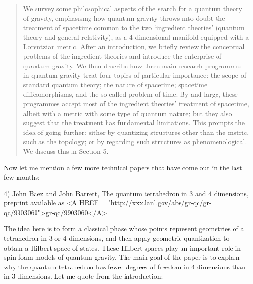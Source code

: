 \begin{quote}
We survey some philosophical aspects of the search for a quantum theory
of gravity, emphasising how quantum gravity throws into doubt the
treatment of spacetime common to the two `ingredient theories' (quantum
theory and general relativity), as a 4-dimensional manifold equipped
with a Lorentzian metric.  After an introduction, we briefly review the
conceptual problems of the ingredient theories and introduce the
enterprise of quantum gravity.  We then describe how three main research
programmes in quantum gravity treat four topics of particular
importance: the scope of standard quantum theory; the nature of
spacetime; spacetime diffeomorphisms, and the so-called problem of time.
By and large, these programmes accept most of the ingredient theories'
treatment of spacetime, albeit with a metric with some type of quantum
nature; but they also suggest that the treatment has fundamental
limitations.  This prompts the idea of going further: either by
quantizing structures other than the metric, such as the topology; or by
regarding such structures as phenomenological.  We discuss this in
Section 5.
\end{quote}

Now let me mention a few more technical papers that have come out in
the last few months:

4) John Baez and John Barrett, The quantum tetrahedron in 3
and 4 dimensions, preprint available as 
<A HREF = "http://xxx.lanl.gov/abs/gr-qc/gr-qc/9903060">gr-qc/9903060</A>.

The idea here is to form a classical phase whose points represent
geometries of a tetrahedron in 3 or 4 dimensions, and then apply
geometric quantization to obtain a Hilbert space of states.  These
Hilbert spaces play an important role in spin foam models of quantum
gravity.  The main goal of the paper is to explain why the quantum
tetrahedron has fewer degrees of freedom in 4 dimensions than in 3
dimensions.  Let me quote from the introduction:

